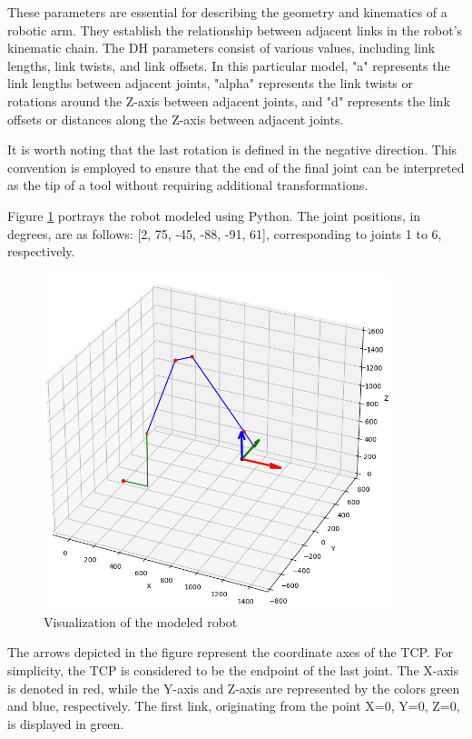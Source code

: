 These parameters are essential for describing the geometry and kinematics of a robotic arm. They establish the relationship between adjacent links in the robot's kinematic chain. The DH parameters consist of various values, including link lengths, link twists, and link offsets. In this particular model, "a" represents the link lengths between adjacent joints, "alpha" represents the link twists or rotations around the Z-axis between adjacent joints, and "d" represents the link offsets or distances along the Z-axis between adjacent joints.

It is worth noting that the last rotation is defined in the negative direction. This convention is employed to ensure that the end of the final joint can be interpreted as the tip of a tool without requiring additional transformations.

Figure \ref{robotprog} portrays the robot modeled using Python. The joint positions, in degrees, are as follows: [2, 75, -45, -88, -91, 61], corresponding to joints 1 to 6, respectively.

 \begin{figure}[H]
	\centerline{\includegraphics[width=0.9\textwidth]{figures/robotprog.png}}
	\caption{Visualization of the modeled robot}
	\label{robotprog}
\end{figure}


The arrows depicted in the figure represent the coordinate axes of the TCP. For simplicity, the TCP is considered to be the endpoint of the last joint. The X-axis is denoted in red, while the Y-axis and Z-axis are represented by the colors green and blue, respectively. The first link, originating from the point X=0, Y=0, Z=0, is displayed in green.


